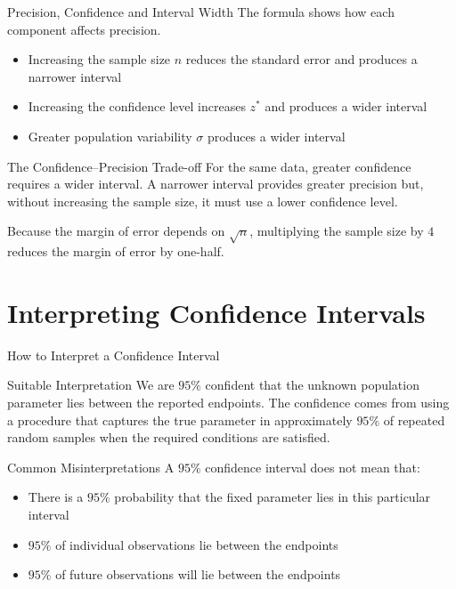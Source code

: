 \documentclass[aspectratio=169]{beamer}
\begin{document}
\begin{frame}{Precision, Confidence and Interval Width}
The formula shows how each component affects precision.
\begin{itemize}
  \item Increasing the sample size $n$ reduces the standard error and produces a narrower interval
  \item Increasing the confidence level increases $z^*$ and produces a wider interval
  \item Greater population variability $\sigma$ produces a wider interval
\end{itemize}
\begin{block}{The Confidence--Precision Trade-off}
For the same data, greater confidence requires a wider interval. A narrower interval provides greater precision but, without increasing the sample size, it must use a lower confidence level.
\end{block}

Because the margin of error depends on $\sqrt{n}$, multiplying the sample size by $4$ reduces the margin of error by one-half.
\end{frame}

\section{Interpreting Confidence Intervals}


\begin{frame}{How to Interpret a Confidence Interval}
\begin{block}{Suitable Interpretation}
We are $95\%$ confident that the unknown population parameter lies between the reported endpoints. The confidence comes from using a procedure that captures the true parameter in approximately $95\%$ of repeated random samples when the required conditions are satisfied.
\end{block}

\begin{alertblock}{Common Misinterpretations}
A $95\%$ confidence interval does not mean that:
\begin{itemize}
  	\item There is a $95\%$ probability that the fixed parameter lies in this particular interval
  	\item $95\%$ of individual observations lie between the endpoints
 	 \item $95\%$ of future observations will lie between the endpoints
\end{itemize}
\end{alertblock}
\end{frame}
\end{document}
